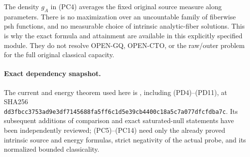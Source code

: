 The density $g_A$ in (PC4) averages the fixed original source
measure along parameters. There is no maximization over an
uncountable family of fiberwise psh functions, and no measurable
choice of intrinsic analytic-fiber solutions. This is why the
exact formula and attainment are available in this explicitly
specified module. They do not resolve OPEN-GQ, OPEN-CTO, or
the raw/outer problem for the full original classical capacity.

\paragraph{Exact dependency snapshot.}
The current and energy theorem used here is
, including
(PD4)--(PD11), at SHA256
\texttt{dd3fbcc3753ad9e3df7145688fa5ff6c1d5e39cb4400c18a5c7a077dfcfdba7c}.
Its subsequent additions of comparison and exact saturated-null
statements have been independently reviewed; (PC5)--(PC14) need
only the already proved intrinsic source and energy formulas,
strict negativity of the actual probe, and its normalized bounded
classicality.
